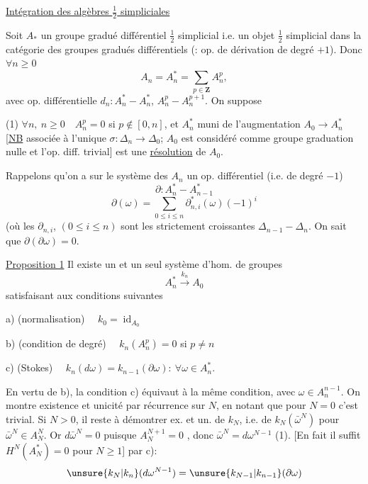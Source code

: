 \uline{Intégration des algèbres $\frac12$ simpliciales}

Soit $A_*$ un groupe gradué différentiel $\frac12$ simplicial
i.e. un objet $\frac12$ simplicial dans la catégorie des groupes
gradués différentiels (: op. de dérivation de degré $+1$).
 Donc $\forall n\geq0$
\[
A_n=A_n^*=\sum_{p\in\mathbf Z}A_n^p,
\]
avec op. différentielle
$d_n:A_n^*\mathbin{-}A_n^*$,
$A_n^p\mathbin{-}A_n^{p+1}$.
On suppose

(1) $\forall n,\ n\geq0\quad A_n^p=0$ si $p\notin[0,n]$,
et  $A_n^*$ muni
de l'augmentation 
$A_0\longrightarrow A_n^*$
[\uline{NB} associée à l'unique $\sigma:\Delta_n\longrightarrow\Delta_0$;
$A_0$ est considéré comme groupe 
graduation nulle et l'op. diff. trivial]
est une \uline{résolution} de $A_0$.

Rappelons qu'on a sur le système des $A_n$ un op.
différentiel (i.e. de degré $-1$)
\[
\partial:A_n^*\mathbin{-}A_{n-1}^*
\]
\[
\partial(\omega)=\sum_{0\leq i\leq n}\partial_{n,i}^*(\omega)(-1)^i
\]
(où les $\partial_{n,i}$, $(0\leq i\leq n)$ sont les 
strictement croissantes $\Delta_{n-1}\mathbin{-}\Delta_n$.
On sait que $\partial(\partial\omega)=0$.

\uline{Proposition 1} Il existe un et un seul système d'hom.
de groupes
\[
A_n^*\xrightarrow{k_n}A_0
\]
satisfaisant aux conditions suivantes

a) (normalisation) $\quad k_0=\operatorname{id}_{A_0}$

b) (condition de degré) $\quad k_n(A_n^p)=0$ si $p\ne n$

c) (Stokes) $\quad k_n(d\omega)=k_{n-1}(\partial\omega):
\ \forall\omega\in A_n^*$.

En vertu de b), la condition c) équivaut à la même
condition, avec $\omega\in A_n^{n-1}$. On montre existence et
unicité par  récurrence sur $N$,
en notant que pour $N=0$ c'est trivial.
Si $N>0$, 
il reste à démontrer ex. et un. de $k_N$, i.e. de
$k_N(\bar\omega^N)$ pour $\bar\omega^N\in A_N^N$.
Or $d\bar\omega^N=0$ puisque $A_N^{N+1}=0$
, donc $\bar\omega^N=d\omega^{N-1}$ (1).
[En fait il suffit  $H^N(A_N^*)=0$ pour $N\geq1$]
 \uline{} par c):
\[
\unsure{k_N|k_n}(d\omega^{N-1})=\unsure{k_{N-1}|k_{n-1}}(\partial\omega)
\]
